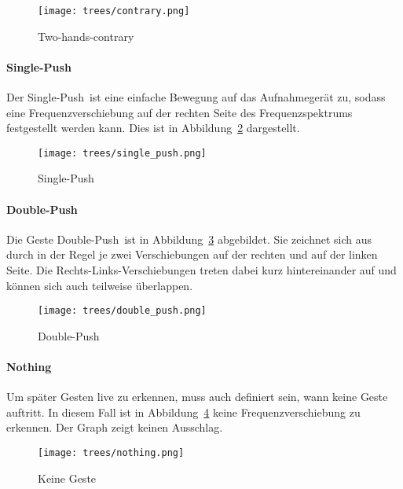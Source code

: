 \begin{figure}[htbp] \centering
\texttt{[image: trees/contrary.png]}
\caption{Two-hands-contrary}
\label{fig:contrary}
\end{figure}


\paragraph*{Single-Push}
Der \glqq Single-Push\grqq\ ist eine einfache Bewegung auf das Aufnahmegerät zu, sodass eine Frequenzverschiebung auf der rechten Seite des Frequenzspektrums festgestellt werden kann. Dies ist in Abbildung~\ref{fig:single_push} dargestellt.

\begin{figure}[htbp] \centering
\texttt{[image: trees/single\_push.png]}
\caption{Single-Push}
\label{fig:single_push}
\end{figure}

\paragraph*{Double-Push}
Die Geste \glqq Double-Push\grqq\ ist in Abbildung~\ref{fig:double_push} abgebildet. Sie zeichnet sich aus durch in der Regel je zwei Verschiebungen auf der rechten und auf der linken Seite. Die Rechts-Links-Verschiebungen treten dabei kurz hintereinander auf und können sich auch teilweise überlappen. 

\begin{figure}[htbp] \centering
\texttt{[image: trees/double\_push.png]}
\caption{Double-Push}
\label{fig:double_push}
\end{figure}

\paragraph*{Nothing}
Um später Gesten live zu erkennen, muss auch definiert sein, wann keine Geste auftritt. In diesem Fall ist in Abbildung~\ref{fig:nothing} keine Frequenzverschiebung zu erkennen. Der Graph zeigt keinen Ausschlag.

\begin{figure}[htbp] \centering
\texttt{[image: trees/nothing.png]}
\caption{Keine Geste}
\label{fig:nothing}
\end{figure}

